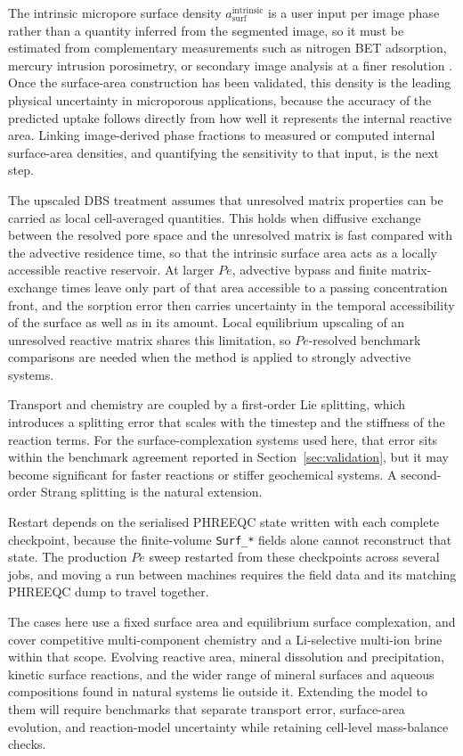 The intrinsic micropore surface density $a_{\mathrm{surf}}^{\mathrm{intrinsic}}$
is a user input per image phase rather than a quantity inferred from the
segmented image, so it must be estimated from complementary measurements such
as nitrogen BET adsorption, mercury intrusion porosimetry, or secondary image
analysis at a finer resolution \citep{noiriel2009changes}. Once the
surface-area construction has been validated, this density is the leading
physical uncertainty in microporous applications, because the accuracy of the
predicted uptake follows directly from how well it represents the internal
reactive area. Linking image-derived phase fractions to measured or computed
internal surface-area densities, and quantifying the sensitivity to that input,
is the next step.

The upscaled DBS treatment assumes that unresolved matrix properties can be
carried as local cell-averaged quantities. This holds when diffusive exchange
between the resolved pore space and the unresolved matrix is fast compared with
the advective residence time, so that the intrinsic surface area acts as a
locally accessible reactive reservoir. At larger $Pe$, advective bypass and
finite matrix-exchange times leave only part of that area accessible to a
passing concentration front, and the sorption error then carries uncertainty in
the temporal accessibility of the surface as well as in its amount. Local
equilibrium upscaling of an unresolved reactive matrix shares this limitation,
so $Pe$-resolved benchmark comparisons are needed when the method is applied to
strongly advective systems.

Transport and chemistry are coupled by a first-order Lie splitting, which
introduces a splitting error that scales with the timestep and the stiffness of
the reaction terms. For the surface-complexation systems used here, that error
sits within the benchmark agreement reported in Section~\ref{sec:validation},
but it may become significant for faster reactions or stiffer geochemical
systems. A second-order Strang splitting \citep{strang1968construction} is the
natural extension.

Restart depends on the serialised PHREEQC state written with each complete
checkpoint, because the finite-volume \texttt{Surf\_*} fields alone cannot
reconstruct that state. The production $Pe$ sweep restarted from these
checkpoints across several jobs, and moving a run between machines requires the
field data and its matching PHREEQC dump to travel together.

The cases here use a fixed surface area and equilibrium surface complexation,
and cover competitive multi-component chemistry and a Li-selective multi-ion
brine within that scope. Evolving reactive area, mineral dissolution and
precipitation, kinetic surface reactions, and the wider range of mineral
surfaces and aqueous compositions found in natural systems lie outside it.
Extending the model to them will require benchmarks that separate transport
error, surface-area evolution, and reaction-model uncertainty while retaining
cell-level mass-balance checks.
